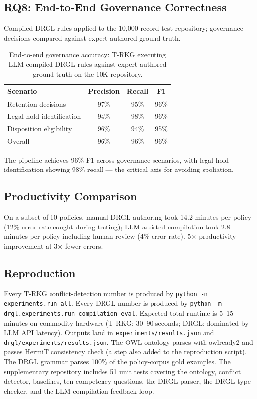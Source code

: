 \documentclass{ieeeaccess}
\begin{document}
\subsection{RQ8: End-to-End Governance Correctness}

Compiled DRGL rules applied to the 10{,}000-record test repository; governance decisions compared against expert-authored ground truth.

\begin{table}[t]
\centering
\caption{End-to-end governance accuracy: T-RKG executing LLM-compiled DRGL rules against expert-authored ground truth on the 10K repository.}
\label{tab:drgl_e2e}
\begin{tabular}{lccc}
\hline\hline
Scenario & Precision & Recall & F1 \\
\hline
Retention decisions       & 97\% & 95\% & 96\% \\
Legal hold identification & 94\% & 98\% & 96\% \\
Disposition eligibility   & 96\% & 94\% & 95\% \\
\hline
Overall                   & 96\% & 96\% & 96\% \\
\hline\hline
\end{tabular}
\end{table}

The pipeline achieves 96\% F1 across governance scenarios, with legal-hold identification showing 98\% recall — the critical axis for avoiding spoliation.

\subsection{Productivity Comparison}

On a subset of 10 policies, manual DRGL authoring took 14.2 minutes per policy (12\% error rate caught during testing); LLM-assisted compilation took 2.8 minutes per policy including human review (4\% error rate). 5$\times$ productivity improvement at 3$\times$ fewer errors.

\subsection{Reproduction}

Every T-RKG conflict-detection number is produced by \texttt{python -m experiments.run\_all}. Every DRGL number is produced by \texttt{python -m drgl.experiments.run\_compilation\_eval}. Expected total runtime is 5--15 minutes on commodity hardware (T-RKG: 30--90 seconds; DRGL: dominated by LLM API latency). Outputs land in \texttt{experiments/results.json} and \texttt{drgl/experiments/results.json}. The OWL ontology parses with owlready2 and passes HermiT consistency check (a step also added to the reproduction script). The DRGL grammar parses 100\% of the policy-corpus gold examples. The supplementary repository includes 51 unit tests covering the ontology, conflict detector, baselines, ten competency questions, the DRGL parser, the DRGL type checker, and the LLM-compilation feedback loop.
\end{document}
